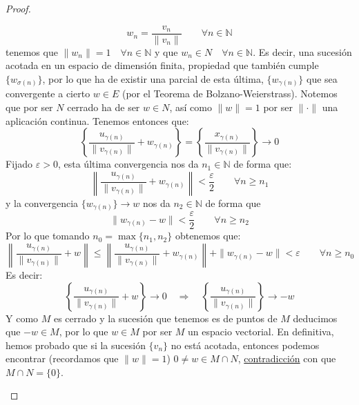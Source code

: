 \begin{ejercicio}
\begin{proof}
\begin{description}
\begin{equation*}
                    w_n = \frac{v_n}{\|v_n\|} \qquad \forall n\in \mathbb{N}
                \end{equation*}
                tenemos que $\|w_n\| = 1 \quad \forall n\in \mathbb{N}$ y que $w_n\in N\quad \forall n\in \mathbb{N}$. Es decir, una sucesión acotada en un espacio de dimensión finita, propiedad que también cumple $\{w_{\sigma(n)}\}$, por lo que ha de existir una parcial de esta última, $\{w_{\gamma(n)}\}$ que sea convergente a cierto $w\in E$ (por el Teorema de Bolzano-Weierstrass). Notemos que por ser $N$ cerrado ha de ser $w\in N$, así como $\|w\| = 1$ por ser $\|\cdot \|$ una aplicación continua. Tenemos entonces que:
                \begin{equation*}
                    \left\{\frac{u_{\gamma(n)}}{\|v_{\gamma(n)}\|} + w_{\gamma(n)}\right\} = \left\{\frac{x_{\gamma(n)}}{\|v_{\gamma(n)}\|}\right\} \to 0
                \end{equation*}
                Fijado $\varepsilon>0$, esta última convergencia nos da $n_1\in \mathbb{N}$ de forma que:
                \begin{equation*}
                    \left\|\frac{u_{\gamma(n)}}{\|v_{\gamma(n)}\|} + w_{\gamma(n)}\right\| < \frac{\varepsilon}{2} \qquad \forall n\geq n_1
                \end{equation*}
                y la convergencia $\{w_{\gamma(n)}\}\to w$ nos da $n_2\in \mathbb{N}$ de forma que
                \begin{equation*}
                    \|w_{\gamma(n)} - w\| < \frac{\varepsilon}{2}\qquad \forall n\geq n_2
                \end{equation*}
                Por lo que tomando $n_0=\max\{n_1,n_2\}$ obtenemos que:
                \begin{equation*}
                    \left\|\frac{u_{\gamma(n)}}{\|v_{\gamma(n)}\|} + w\right\| \leq \left\|\frac{u_{\gamma(n)}}{\|v_{\gamma(n)}\|} + w_{\gamma(n)}\right\| + \|w_{\gamma(n)}  - w\| < \varepsilon \qquad \forall n\geq n_0
                \end{equation*}
                Es decir:
                \begin{equation*}
                    \left\{\frac{u_{\gamma(n)}}{\|v_{\gamma(n)}\|} + w\right\} \to 0 \quad \Longrightarrow \quad \left\{\frac{u_{\gamma(n)}}{\|v_{\gamma(n)}\|}\right\} \to -w
                \end{equation*}
                Y como $M$ es cerrado y la sucesión que tenemos es de puntos de $M$ deducimos que $-w\in M$, por lo que $w\in M$ por ser $M$ un espacio vectorial. En definitiva, hemos probado que si la sucesión $\{v_n\}$ no está acotada, entonces podemos encontrar (recordamos que $\|w\|=1$) $0\neq w \in M\cap N$, \underline{contradicción} con que $M\cap N = \{0\}$.

\end{description}
\end{proof}
\end{ejercicio}
